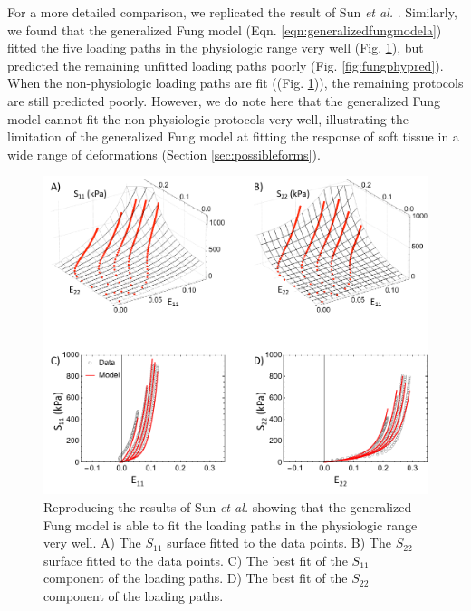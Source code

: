     For a more detailed comparison, we replicated the result of Sun \textit{et al.} \cite{sun_biaxial_2003}. Similarly, we found that the generalized Fung model (Eqn. \ref{eqn:generalizedfungmodela}) fitted the five loading paths in the physiologic range very well (Fig. \ref{fig:fungphyfit}), but predicted the remaining unfitted loading paths poorly (Fig. \ref{fig:fungphypred}). When the non-physiologic loading paths are fit ((Fig. \ref{fig:fungphyfit})), the remaining protocols are still predicted poorly. However, we do note here that the generalized Fung model cannot fit the non-physiologic protocols very well, illustrating the limitation of the generalized Fung model at fitting the response of soft tissue in a wide range of deformations (Section \ref{sec:possibleforms}). 

\begin{figure}[hptb]
\centering
\includegraphics[width=\textwidth]{Images/chapter5/fungphyfit}
\caption{Reproducing the results of Sun \textit{et al.} \cite{sun_biaxial_2003} showing that the generalized Fung model is able to fit the loading paths in the physiologic range very well. A) The $S_{11}$ surface fitted to the data points. B) The $S_{22}$ surface fitted to the data points. C) The best fit of the $S_{11}$ component of the loading paths. D) The best fit of the $S_{22}$ component of the loading paths.}
\label{fig:fungphyfit}
\end{figure} 

